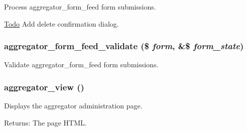 Process aggregator\_\-form\_\-feed form submissions.

\begin{Desc}
\item[\hyperlink{todo__todo000001}{Todo}]Add delete confirmation dialog. \end{Desc}
\hypertarget{aggregator_8admin_8inc_4a4b42f6a1e73d72fb1e55c0f20fcf02}{
\subsubsection[{aggregator\_\-form\_\-feed\_\-validate}]{\setlength{\rightskip}{0pt plus 5cm}aggregator\_\-form\_\-feed\_\-validate (\$ {\em form}, \/  \&\$ {\em form\_\-state})}}
\label{aggregator_8admin_8inc_4a4b42f6a1e73d72fb1e55c0f20fcf02}


Validate aggregator\_\-form\_\-feed form submissions. \hypertarget{aggregator_8admin_8inc_dbb245c75bc2cb47e784fb454e134594}{
\subsubsection[{aggregator\_\-view}]{\setlength{\rightskip}{0pt plus 5cm}aggregator\_\-view ()}}
\label{aggregator_8admin_8inc_dbb245c75bc2cb47e784fb454e134594}


Displays the aggregator administration page.

\begin{Desc}
\item[Returns:]The page HTML. \end{Desc}
